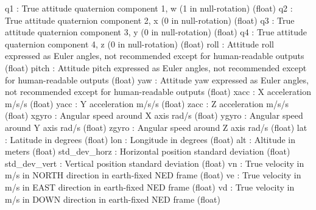 \begin{DoxyVerb}
\begin{DoxyVerb}
\begin{DoxyVerb}
\begin{DoxyVerb}
\begin{DoxyVerb}
\begin{DoxyVerb}
\begin{DoxyVerb}
\begin{DoxyVerb}
\begin{DoxyVerb}
\begin{DoxyVerb}
\begin{DoxyVerb}
q1                        : True attitude quaternion component 1, w (1 in null-rotation) (float)
q2                        : True attitude quaternion component 2, x (0 in null-rotation) (float)
q3                        : True attitude quaternion component 3, y (0 in null-rotation) (float)
q4                        : True attitude quaternion component 4, z (0 in null-rotation) (float)
roll                      : Attitude roll expressed as Euler angles, not recommended except for human-readable outputs (float)
pitch                     : Attitude pitch expressed as Euler angles, not recommended except for human-readable outputs (float)
yaw                       : Attitude yaw expressed as Euler angles, not recommended except for human-readable outputs (float)
xacc                      : X acceleration m/s/s (float)
yacc                      : Y acceleration m/s/s (float)
zacc                      : Z acceleration m/s/s (float)
xgyro                     : Angular speed around X axis rad/s (float)
ygyro                     : Angular speed around Y axis rad/s (float)
zgyro                     : Angular speed around Z axis rad/s (float)
lat                       : Latitude in degrees (float)
lon                       : Longitude in degrees (float)
alt                       : Altitude in meters (float)
std_dev_horz              : Horizontal position standard deviation (float)
std_dev_vert              : Vertical position standard deviation (float)
vn                        : True velocity in m/s in NORTH direction in earth-fixed NED frame (float)
ve                        : True velocity in m/s in EAST direction in earth-fixed NED frame (float)
vd                        : True velocity in m/s in DOWN direction in earth-fixed NED frame (float)\end{DoxyVerb}
 \mbox{\label{classpymavlink_1_1dialects_1_1v10_1_1MAVLink_aab9e585cfdfe1901558cbf6e335e11b7}} 

\end{DoxyVerb}
\end{DoxyVerb}
\end{DoxyVerb}
\end{DoxyVerb}
\end{DoxyVerb}
\end{DoxyVerb}
\end{DoxyVerb}
\end{DoxyVerb}
\end{DoxyVerb}
\end{DoxyVerb}
